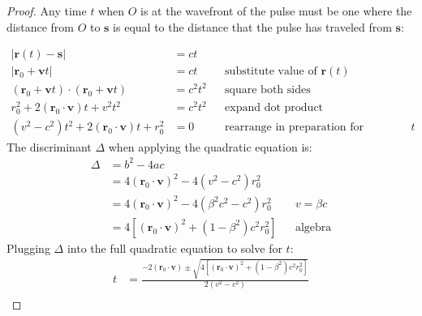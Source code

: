 \documentclass[a4paper]{article}
\theoremstyle{plain}
\theoremstyle{definition}
\newcommand{\vect}[1]{\mathbf{#1}}
\begin{document}
\begin{proof}
Any time $t$ when $O$ is at the wavefront of the pulse must be one
where the distance from $O$ to $\vect{s}$ is equal to the distance
that the pulse has traveled from $\vect{s}$:

\begin{align*}
|\vect{r}(t) - \vect{s}| & = ct \\
|\vect{r}_0 + \vect{v}t| & = ct & & \text{substitute value of $\vect{r}(t)$} \\
(\vect{r}_0 + \vect{v}t) \cdot (\vect{r}_0 + \vect{v}t) & = c^2t^2 & & \text{square both sides} \\
r_0^2 + 2(\vect{r}_0 \cdot \vect{v})t + v^2t^2 & = c^2t^2 & & \text{expand dot product} \\
(v^2-c^2)t^2 + 2(\vect{r}_0 \cdot \vect{v})t + r_0^2 & = 0 & & \text{rearrange in preparation for quadratic equation on $t$}
\end{align*}
The discriminant $\Delta$ when applying the quadratic equation is:
\begin{align*}
\Delta
  & = b^2 - 4ac \\
  & = 4(\vect{r}_0 \cdot \vect{v})^2 - 4(v^2 - c^2)r_0^2 \\
  & = 4(\vect{r}_0 \cdot \vect{v})^2 - 4(\beta^2 c^2 - c^2)r_0^2 & & \text{$v=\beta c$} \\
  & = 4 \left[ (\vect{r}_0 \cdot \vect{v})^2 + (1-\beta^2)c^2 r_0^2 \right] & & \text{algebra}
\end{align*}
Plugging $\Delta$ into the full quadratic equation to solve for $t$:
\begin{align*}
t
  & = \frac{-2(\vect{r}_0 \cdot \vect{v}) \pm \sqrt{4 \left[ (\vect{r}_0 \cdot \vect{v})^2 + (1-\beta^2)c^2 r_0^2 \right]}}{2(v^2 - c^2)} \\

\end{align*}
\end{proof}
\end{document}
